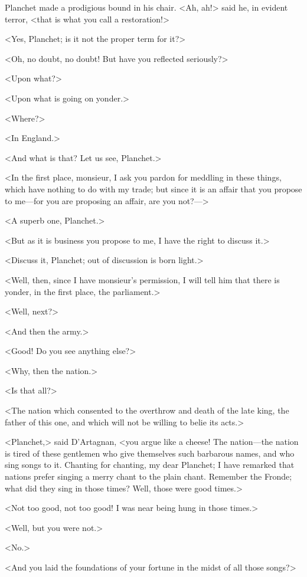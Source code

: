 Planchet made a prodigious bound in his chair. <Ah, ah!> said he, in evident terror, <that is what you call a restoration!>

<Yes, Planchet; is it not the proper term for it?>

<Oh, no doubt, no doubt! But have you reflected seriously?>

<Upon what?>

<Upon what is going on yonder.>

<Where?>

<In England.>

<And what is that? Let us see, Planchet.>

<In the first place, monsieur, I ask you pardon for meddling in these things, which have nothing to do with my trade; but since it is an affair that you propose to me—for you are proposing an affair, are you not?—>

<A superb one, Planchet.>

<But as it is business you propose to me, I have the right to discuss it.>

<Discuss it, Planchet; out of discussion is born light.>

<Well, then, since I have monsieur's permission, I will tell him that there is yonder, in the first place, the parliament.>

<Well, next?>

<And then the army.>

<Good! Do you see anything else?>

<Why, then the nation.>

<Is that all?>

<The nation which consented to the overthrow and death of the late king, the father of this one, and which will not be willing to belie its acts.>

<Planchet,> said D'Artagnan, <you argue like a cheese! The nation—the nation is tired of these gentlemen who give themselves such barbarous names, and who sing songs to it. Chanting for chanting, my dear Planchet; I have remarked that nations prefer singing a merry chant to the plain chant. Remember the Fronde; what did they sing in those times? Well, those were good times.>

<Not too good, not too good! I was near being hung in those times.>

<Well, but you were not.>

<No.>

<And you laid the foundations of your fortune in the midst of all those songs?>

